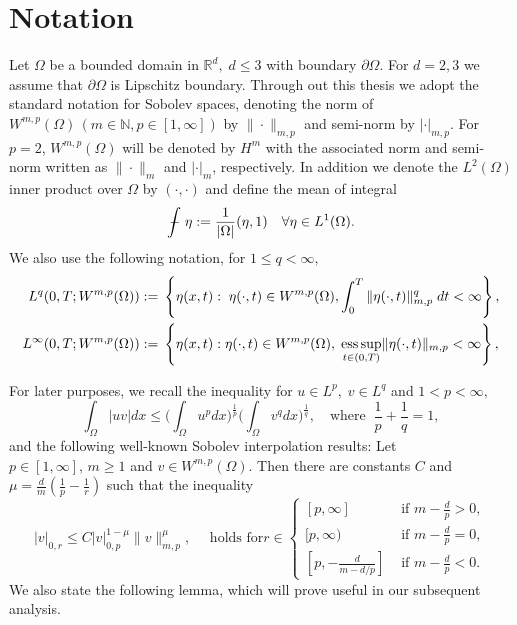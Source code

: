 \section{Notation}
Let $\Omega$ be a bounded domain in $\mathbb{R}^d,\; d\leq3$ with
boundary $\partial\Omega$. For
$d=2,3$ we assume that $\partial\Omega$ is Lipschitz boundary. 
Through out this thesis we adopt the standard notation for
Sobolev spaces, denoting the norm of $W^{m,p}(\Omega)\, (m \in
{\mathbb N}, p \in [1,\infty])$ by $\|\cdot\|_{m,p}$ and semi-norm by
$|\cdot|_{m,p}.$   For $p=2$,  $W^{m,p}(\Omega)$ will be denoted by
$H^m$ with the associated norm and semi-norm written as 
$\|\cdot\|_{m}$ and $|\cdot|_{m}$, respectively. In addition we denote the
$L^2(\Omega)$ inner product over $\Omega$ by $(\cdot,\cdot)$ and
define the mean of integral
\[\int\!\!\!\!\!\!{\rm-}\  \eta := \frac{1}{|\Omega|}(\eta,1)\quad \forall\eta \in L^1(\Omega).\]
We also use the following notation, for $1 \leq q < \infty,$
\begin{align*}
L^{q}(0,T;W^{m,p}(\Omega)):=& \; \left\{ \eta(x,t):\;  \eta(\cdot,t) \in W^{m,p}(\Omega), \int_0^T  \|\eta(\cdot,t)\|_{m,p}^q\; dt < \infty\right \},\\
L^{\infty}(0,T;W^{m,p}(\Omega)):=& \; \left\{ \eta(x,t):
\eta(\cdot,t) \in W^{m,p}(\Omega)
,\; \displaystyle{\operatornamewithlimits{ess\,sup}_{t\in (0,T)}} \|\eta(\cdot,t)\|_{m,p} < \infty\right \},
\end{align*}

For later purposes, we recall the \holder inequality for $u\in L^p,\; v\in L^q$
and $1<p<\infty,$
\begin{equation}
\int_\Omega |uv| dx \leq \bigg(\int_\Omega u^p dx\bigg)^{\frac{1}{p}}\bigg(
\int_\Omega v^q dx \bigg)^{\frac{1}{q}},\quad\mbox{where}\;\; \frac{1}{p}+\frac{1}{q}=1,\label{Holder}
\end{equation}
and the following well-known Sobolev
interpolation results: Let $p \in
[1,\infty],\, m \geq 1$ and $v \in W^{m,p}(\Omega)$.  Then
there are constants $C$ and $\mu=
\frac{d}{m}\left(\frac{1}{p}-\frac{1}{r}  \right )$ such that the
inequality
\begin{equation}
|v|_{0,r} \leq C|v|^{1-\mu}_{0,p} \|v\|^\mu_{m,p},\quad \mbox{ holds for
} 
r\in 
\begin{cases}
        \mbox{$[p,\infty]$}&  \mbox{ if }  m-\frac{d}{p} > 0,\\
        \mbox{$[p,\infty)$} &\mbox{ if } m-\frac{d}{p} = 0,\\
        \mbox{$[p,-\frac{d}{ m-d/p}]$}& \mbox{ if } m-\frac{d}{p} < 0.
\end{cases}\label{gagliar}
\end{equation}
We also state the following lemma, which will prove useful
in our subsequent analysis.

